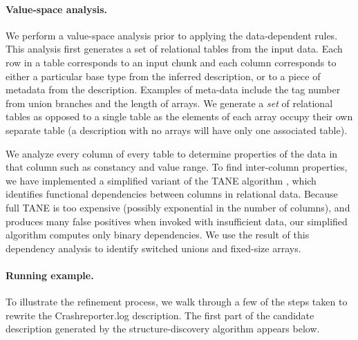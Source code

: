 \paragraph*{Value-space analysis.}
We perform a value-space analysis prior
to applying the data-dependent rules.
This analysis first generates a set of relational tables from the input data.
Each row in a table corresponds to an input chunk and each column
corresponds to either a particular base type from the inferred description,
or to a piece of metadata from the description.  Examples of meta-data
include the tag number from union branches and the length of arrays.
We generate a {\em set} of relational tables as opposed to a single table
as the elements of each array occupy their own separate table (a description 
with no arrays will have only one associated table).

We analyze every column of every table to determine properties of the
data in that column such as constancy and value range. 
To find inter-column properties, we have implemented a simplified
variant of the TANE algorithm \cite{TANE-HKPT99},
which identifies functional dependencies between columns in 
relational data.  Because full TANE is too expensive
(possibly exponential in the number of columns), 
and produces many false positives when invoked with insufficient data,
our simplified algorithm computes only binary dependencies. We use the 
result of this dependency analysis to identify switched unions and
fixed-size arrays. 

\paragraph*{Running example.}
To illustrate the refinement process, we walk through a few of the
steps taken to rewrite the 
Crashreporter.log description.  The first part of the
candidate description generated by the structure-discovery algorithm
appears below.


